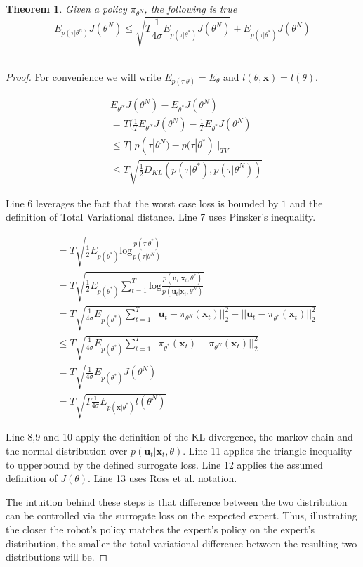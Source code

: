 \documentclass[10pt, conference]{ieeeconf}      %
\newtheorem{theorem}{Theorem}[section]
\newcommand{\bu}{\mathbf{u}}
\newcommand{\bx}{\mathbf{x}}
\begin{document}
\begin{theorem}
Given a policy $\pi_{\theta^N}$, the following is true 
$$E_{p(\tau|\theta^n)} J(\theta^N) \leq \sqrt{T\frac{1}{4\sigma}E_{p(\tau|\theta^*)} J(\theta^N)}+E_{p(\tau|\theta^*)} J(\theta^N)$$\\
\end{theorem}
\begin{proof}
For convenience we will write $E_{p(\tau|\theta)} = E_{\theta}$ and $l(\theta,\bx) = l(\theta)$. 

\begin{align}
&E_{\theta^N} J(\theta^N) - E_{\theta^*} J(\theta^N) \\
&= T(\frac{1}{T}E_{\theta^N} J(\theta^N) -\frac{1}{T}E_{\theta^*} J(\theta^N)\\
&\leq  T| | p(\tau|\theta^N) - p(\tau|\theta^*)||_{TV}\\
&\leq T\sqrt{\frac{1}{2} D_{KL}(p(\tau|\theta^*),p(\tau|\theta^N))}
\end{align}

 Line 6 leverages the fact that the worst case loss is bounded by $1$ and the definition of Total Variational distance. Line 7 uses Pinsker's inequality. 


\begin{align}
&= T\sqrt{\frac{1}{2} E_{p(\theta^*)} \mbox{log} \frac{p(\tau|\theta^*)}{p(\tau|\theta^N)}}\\
&= T\sqrt{\frac{1}{2} E_{p(\theta^*)} \sum^T_{t=1}\mbox{log} \frac{p(\bu_t|\bx_t,\theta^*)}{p(\bu_t|\bx_t,\theta^N)}}\\
&= T\sqrt{\frac{1}{4\sigma} E_{p(\theta^*)} \sum^T_{t=1} ||\bu_t- \pi_{\theta^N}(\bx_t)||_2^2 - ||\bu_t- \pi_{\theta^*}(\bx_t)||_2^2}\\
&\leq T\sqrt{\frac{1}{4\sigma} E_{p(\theta^*)} \sum^T_{t=1}  ||\pi_{\theta^*}(\bx_t) - \pi_{\theta^N}(\bx_t)||_2^2}\\
&= T\sqrt{\frac{1}{4\sigma} E_{p(\theta^*)} J(\theta^N)}\\
&= T\sqrt{T \frac{1}{4\sigma} E_{p(\bx|\theta^*)} l(\theta^N)}
\end{align}

Line 8,9 and 10 apply the definition of the KL-divergence, the markov chain and the normal distribution over $p(\bu_t|\bx_t,\theta)$. Line 11 applies the triangle inequality to upperbound by the defined surrogate loss. Line 12 applies the assumed definition of $J(\theta)$. Line 13 uses Ross et al. notation. 

The intuition behind these steps is that difference between  the two distribution can be controlled via the surrogate loss on the expected expert. Thus, illustrating the closer the robot's policy matches the expert's policy on the expert's distribution, the smaller the total variational difference between the resulting two distributions will be. 
\end{proof}
  
\end{document}
